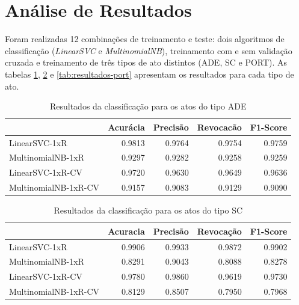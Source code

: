 \section{Análise de Resultados}

Foram realizadas 12 combinações de treinamento e teste: dois algoritmos de classificação (\textit{LinearSVC} e \textit{MultinomialNB}), treinamento com e sem validação cruzada e treinamento de três tipos de ato distintos (ADE, SC e PORT). As tabelas \ref{tab:resultados-ade}, \ref{tab:resultados-sc} e \ref{tab:resultados-port} apresentam os resultados para cada tipo de ato.

\begin{table}[h]
\caption{Resultados da classificação para os atos do tipo ADE}
\label{tab:resultados-ade}
	\begin{center}
	\begin{tabular}{lrrrr}
		\toprule
		{} &  Acurácia &  Precisão &  Revocacão &      F1-Score \\
		\midrule
		LinearSVC-1xR        &    0.9813 &    0.9764 &     0.9754 &  0.9759 \\
		MultinomialNB-1xR    &    0.9297 &    0.9282 &     0.9258 &  0.9259 \\
		LinearSVC-1xR-CV     &    0.9720 &    0.9630 &     0.9649 &  0.9636 \\
		MultinomialNB-1xR-CV &    0.9157 &    0.9083 &     0.9129 &  0.9090 \\
		\bottomrule
	\end{tabular}
	\end{center}		
\end{table}

\begin{table}[h]
\caption{Resultados da classificação para os atos do tipo SC}
\label{tab:resultados-sc}
	\begin{center}
	\begin{tabular}{lrrrr}
		\toprule
		{} &  Acuracia &  Precisão &  Revocação &      F1-Score \\
		\midrule
		LinearSVC-1xR        &    0.9906 &    0.9933 &     0.9872 &  0.9902 \\
		MultinomialNB-1xR    &    0.8291 &    0.9043 &     0.8088 &  0.8278 \\
		LinearSVC-1xR-CV     &    0.9780 &    0.9860 &     0.9619 &  0.9730 \\
		MultinomialNB-1xR-CV &    0.8129 &    0.8507 &     0.7950 &  0.7968 \\
		\bottomrule
	\end{tabular}
	\end{center}		
\end{table}

